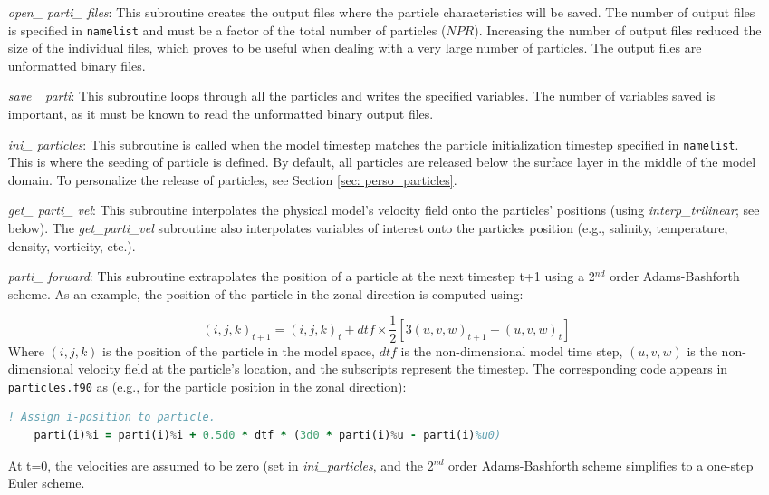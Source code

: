 \documentclass[12pt,letterpaper,titlepage]{article}
\begin{document}
\begin{itemize}
	
	\item[\textit{open\_ parti\_ files}:] This subroutine creates the output files where the particle characteristics will be saved. The number of output files is specified in \texttt{namelist} and must be a factor of the total number of particles ($NPR$). Increasing the number of output files reduced the size of the individual files, which proves to be useful when dealing with a very large number of particles. The output files are unformatted binary files.
	
	\item[\textit{save\_ parti}:] This subroutine loops through all the particles and writes the specified variables. The number of variables saved is important, as it must be known to read the unformatted binary output files.
	
	\item[\textit{ini\_ particles}:] This subroutine is called when the model timestep matches the particle initialization timestep specified in \texttt{namelist}. This is where the seeding of particle is defined. By default, all particles are released below the surface layer in the middle of the model domain. To personalize the release of particles, see Section \ref{sec: perso_particles}.
	
	\item[\textit{get\_ parti\_ vel}:] This subroutine interpolates the physical model's velocity field onto the particles' positions (using \textit{interp\_trilinear}; see below). The \textit{get\_parti\_vel} subroutine also interpolates variables of interest onto the particles position (e.g., salinity, temperature, density, vorticity, etc.).
	
	\item[\textit{parti\_ forward}:] This subroutine extrapolates the position of a particle at the next timestep t+1 using a 2$^{nd}$ order Adams-Bashforth scheme. As an example, the position of the particle in the zonal direction is computed using:
	
	\begin{equation*}
		(i,j,k)_{t+1}= (i,j,k)_{t} + dtf \times \frac{1}{2}[3(u,v,w)_{t+1} - (u,v,w)_{t}]
	\end{equation*}
	Where $(i,j,k)$ is the position of the particle in the model space, $dtf$ is the non-dimensional model time step, $(u,v,w)$ is the non-dimensional velocity field at the particle's location, and the subscripts represent the timestep. The corresponding code appears in \texttt{particles.f90} as (e.g., for the particle position in the zonal direction):
	\begin{lstlisting}[language=fortran]
	! Assign i-position to particle.
	parti(i)%i = parti(i)%i + 0.5d0 * dtf * (3d0 * parti(i)%u - parti(i)%u0)
	\end{lstlisting}
	At t=0, the velocities are assumed to be zero (set in \textit{ini\_particles}, and the 2$^{nd}$ order Adams-Bashforth scheme simplifies to a one-step Euler scheme.
	

\end{itemize}
\end{document}
